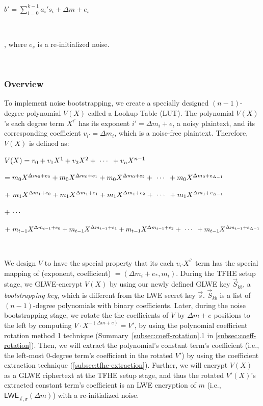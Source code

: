 $ $

$b' = \sum\limits_{i=0}^{k-1} a_i's_i + \Delta m + e_s$

$ $

, where $e_s$ is a re-initialized noise. 

$ $
\subsubsection{Overview}
\label{subsec:bootstrapping-overview}

To implement noise bootstrapping, we create a specially designed $(n-1)$-degree polynomial $V(X)$ called a Lookup Table (LUT). The polynomial $V(X)$'s each degree term $X^{i'}$ has its exponent $i' = \Delta m_i + e$, a noisy plaintext, and its corresponding coefficient $v_{i'} = \Delta m_i$, which is a noise-free plaintext. Therefore, $V(X)$ is defined as:

$V(X) = v_0 + v_1X^1 + v_2X^2 + \text{ } \text{$\cdots$} \text{ } + v_nX^{n-1}$

\text{ } $= m_0X^{\Delta m_0 + e_0} + m_0X^{\Delta m_0 + e_1} + m_0X^{\Delta m_0 + e_2} + \text{ } \text{$\cdots$} \text{ } + m_0X^{\Delta m_0 + e_{\Delta - 1}}$

\text{ } $ + \text{ } m_1X^{\Delta m_1 + e_0} + m_1X^{\Delta m_1 + e_1} + m_1X^{\Delta m_1 + e_2} + \text{ } \text{$\cdots$} \text{ } + m_1X^{\Delta m_1 + e_{\Delta - 1}}$

\text{ } $ + \text{ } \text{$\cdots$} \text{ } $

\text{ } $ + \text{ } m_{t - 1}X^{\Delta m_{t - 1} + e_0} + m_{t - 1}X^{\Delta m_{t - 1} + e_1} + m_{t - 1}X^{\Delta m_{t - 1} + e_2} + \text{ } \text{$\cdots$} \text{ } + m_{t - 1}X^{\Delta m_{t - 1} + e_{\Delta - 1}}$

$ $

We design $V$ to have the special property that its each $v_{i'}X^{i'}$ term has the special mapping of (exponent, coefficient) $= (\Delta m_i + e_{*}, m_i)$. During the TFHE setup stage, we GLWE-encrypt $V(X)$ by using our newly defined GLWE key $\vec{S}_{kb}$, a \textit{bootstrapping key}, which is different from the LWE secret key $\vec{s}$. $\vec{S}_{kb}$ is a list of $(n-1)$-degree polynomials with binary coefficients. Later, during the noise bootstrapping stage, we rotate the the coefficients of $V$ by $\Delta m + e$ positions to the left by computing $V \cdot X^{-(\Delta m + e)} = V'$, by using the polynomial coefficient rotation method 1 technique (Summary~\ref*{subsec:coeff-rotation}.1 in \autoref{subsec:coeff-rotation}). Then, we will extract the polynomial's constant term's coefficient (i.e., the left-most 0-degree term's coefficient in the rotated $V'$) by using the coefficient extraction technique (\autoref{subsec:tfhe-extraction}). Further, we will encrypt $V(X)$ as a GLWE ciphertext at the TFHE setup stage, and thus the rotated $V'(X)$'s extracted constant term's coefficient is an LWE encryption of $m$ (i.e., $\textsf{LWE}_{\vec{s}, \sigma}(\Delta m)$) with a re-initialized noise. 

